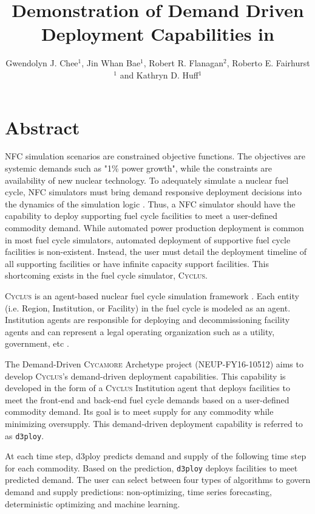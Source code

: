 \documentclass{anstrans}
\title{Demonstration of Demand Driven Deployment Capabilities in \Cyclus}
\author{Gwendolyn J. Chee$^1$, Jin Whan Bae$^1$, Robert R. Flanagan$^2$, Roberto E. Fairhurst$^1$ and Kathryn D. Huff$^1$}
\institute{
$^1$Dept. of Nuclear, Plasma and Radiological Engineering, University of Illinois at Urbana-Champaign \\
$^2$Nuclear Engineering Program, University of South Carolina \\

gchee2@illinois.edu
}
\newcommand{\Cyclus}{\textsc{Cyclus}\xspace}%
\newcommand{\Cycamore}{\textsc{Cycamore}\xspace}%
\begin{document}
\section{Abstract}
\gls{NFC} simulation scenarios are constrained objective functions. 
The objectives are systemic demands such as "1\% power growth", while the 
constraints are availability of new nuclear technology. 
To adequately simulate a nuclear fuel cycle, \gls{NFC} simulators 
must bring demand responsive deployment decisions into the dynamics of the 
simulation logic \cite{huff_current_2017}. 
Thus, a \gls{NFC} simulator should have the capability to deploy 
supporting fuel cycle facilities to meet a user-defined commodity demand. 
While automated power production deployment is common in most fuel cycle 
simulators, automated deployment of supportive fuel cycle 
facilities is non-existent. 
Instead, the user must detail the deployment timeline of all supporting 
facilities or have infinite capacity support facilities. This shortcoming 
exists in the fuel cycle simulator, \Cyclus. 

\Cyclus is an agent-based nuclear fuel cycle simulation framework 
\cite{huff_fundamental_2016}. 
Each entity (i.e. Region, Institution, or Facility) in the fuel cycle is modeled 
as an agent. 
Institution agents
are responsible for deploying and decommissioning facility agents and
can represent a legal operating organization such as a 
utility, government, etc \cite{huff_fundamental_2016}. 

The Demand-Driven \Cycamore Archetype project (NEUP-FY16-10512) aims to 
develop \Cyclus's demand-driven deployment capabilities. 
This capability is developed in the form of a \Cyclus Institution agent that 
deploys facilities to meet the front-end and back-end fuel cycle demands
based on a user-defined commodity demand. 
Its goal is to meet supply for any commodity while minimizing oversupply.
This demand-driven deployment capability is referred to as \texttt{d3ploy}. 

At each time step, d3ploy predicts demand and supply of the following time step 
for each commodity.
Based on the prediction, \texttt{d3ploy} deploys facilities to 
meet predicted demand. 
The user can select between four types of algorithms to govern demand and supply 
predictions: 
non-optimizing, time series forecasting, deterministic optimizing and machine 
learning. 
\end{document}
